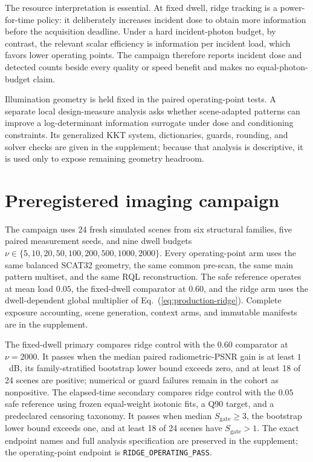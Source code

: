 \documentclass[10pt,twocolumn]{article}
\begin{document}
The resource interpretation is essential. At fixed dwell, ridge tracking is a
power-for-time policy: it deliberately increases incident dose to obtain more
information before the acquisition deadline. Under a hard incident-photon
budget, by contrast, the relevant scalar efficiency is information per incident
load, which favors lower operating points. The campaign therefore reports
incident dose and detected counts beside every quality or speed benefit and
makes no equal-photon-budget claim.

Illumination geometry is held fixed in the paired operating-point tests. A
separate local design-measure analysis asks whether scene-adapted patterns can
improve a log-determinant information surrogate under dose and conditioning
constraints. Its generalized KKT system, dictionaries, guards, rounding, and
solver checks are given in the supplement; because that analysis is descriptive,
it is used only to expose remaining geometry headroom.

\section{Preregistered imaging campaign}
\label{sec:campaign}
The campaign uses 24 fresh simulated scenes from six structural families, five
paired measurement seeds, and nine dwell budgets
$\nu\in\{5,10,20,50,100,200,500,1000,2000\}$. Every operating-point arm uses
the same balanced SCAT32 geometry, the same common pre-scan, the same main
pattern multiset, and the same RQL reconstruction. The safe reference operates
at mean load $0.05$, the fixed-dwell comparator at $0.60$, and the ridge arm
uses the dwell-dependent global multiplier of Eq.~(\ref{eq:production-ridge}).
Complete exposure accounting, scene generation, context arms, and immutable
manifests are in the supplement.

The fixed-dwell primary compares ridge control with the $0.60$ comparator at
$\nu=2000$. It passes when the median paired radiometric-PSNR gain is at least
$1$~dB, its family-stratified bootstrap lower bound exceeds zero, and at least
18 of 24 scenes are positive; numerical or guard failures remain in the cohort
as nonpositive. The elapsed-time secondary compares ridge control with the
$0.05$ safe reference using frozen equal-weight isotonic fits, a Q90 target,
and a predeclared censoring taxonomy. It passes when median
$S_{\mathrm{gate}}\ge3$, the bootstrap lower bound exceeds one, and at least
18 of 24 scenes have $S_{\mathrm{gate}}>1$. The exact endpoint names and full
analysis specification are preserved in the supplement; the operating-point
endpoint is \texttt{RIDGE\_OPERATING\_PASS}.
\end{document}
